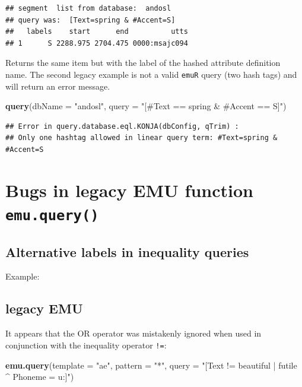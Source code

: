 \documentclass[]{book}
\newenvironment{Shaded}{\begin{snugshade}}{\end{snugshade}}
\newcommand{\DataTypeTok}[1]{\textcolor[rgb]{0.13,0.29,0.53}{#1}}
\newcommand{\KeywordTok}[1]{\textcolor[rgb]{0.13,0.29,0.53}{\textbf{#1}}}
\newcommand{\NormalTok}[1]{#1}
\newcommand{\StringTok}[1]{\textcolor[rgb]{0.31,0.60,0.02}{#1}}
\theoremstyle{definition}
\theoremstyle{definition}
\theoremstyle{definition}
\theoremstyle{remark}
\begin{document}
\begin{verbatim}
## segment  list from database:  andosl
## query was:  [Text=spring & #Accent=S]
##   labels    start      end          utts
## 1      S 2288.975 2704.475 0000:msajc094
\end{verbatim}

Returns the same item but with the label of the hashed attribute
definition name. The second legacy example is not a valid \texttt{emuR}
query (two hash tags) and will return an error message.

\begin{Shaded}
\begin{Highlighting}[]
\KeywordTok{query}\NormalTok{(}\DataTypeTok{dbName =} \StringTok{"andosl"}\NormalTok{,}
      \DataTypeTok{query =} \StringTok{"[#Text == spring & #Accent == S]"}\NormalTok{)}
\end{Highlighting}
\end{Shaded}

\begin{verbatim}
## Error in query.database.eql.KONJA(dbConfig, qTrim) :
## Only one hashtag allowed in linear query term: #Text=spring & #Accent=S
\end{verbatim}

\hypertarget{bugs-in-legacy-emu-function-emu.query}{%
\section{\texorpdfstring{Bugs in legacy EMU function
\texttt{emu.query()}}{Bugs in legacy EMU function emu.query()}}\label{bugs-in-legacy-emu-function-emu.query}}

\hypertarget{alternative-labels-in-inequality-queries}{%
\subsection{Alternative labels in inequality
queries}\label{alternative-labels-in-inequality-queries}}

Example:

\hypertarget{legacy-emu-1}{%
\subsection{legacy EMU}\label{legacy-emu-1}}

It appears that the OR operator \texttt{\textbar{}} was mistakenly
ignored when used in conjunction with the inequality operator
\texttt{!=}:

\begin{Shaded}
\begin{Highlighting}[]
\KeywordTok{emu.query}\NormalTok{(}\DataTypeTok{template =} \StringTok{"ae"}\NormalTok{,}
          \DataTypeTok{pattern =} \StringTok{"*"}\NormalTok{,}
          \DataTypeTok{query =} \StringTok{"[Text != beautiful | futile ^ Phoneme = u:]"}\NormalTok{)}
\end{Highlighting}
\end{Shaded}
\end{document}
